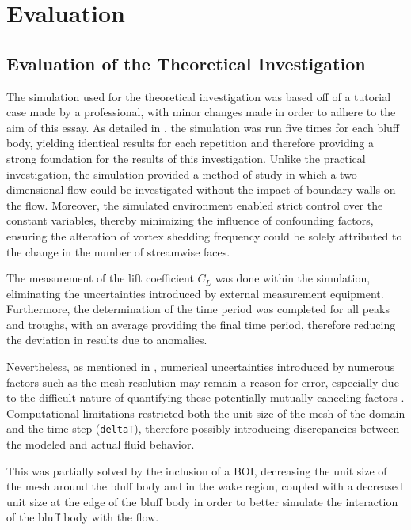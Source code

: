 \section{Evaluation}

\subsection{Evaluation of the Theoretical Investigation}
The simulation used for the theoretical investigation was based off of a tutorial case made by a professional, with minor changes made in order to adhere to the aim of this essay. As detailed in , the simulation was run five times for each bluff body, yielding identical results for each repetition and therefore providing a strong foundation for the results of this investigation. Unlike the practical investigation, the simulation provided a method of study in which a two-dimensional flow could be investigated without the impact of boundary walls on the flow. Moreover, the simulated environment enabled strict control over the constant variables, thereby minimizing the influence of confounding factors, ensuring the alteration of vortex shedding frequency could be solely attributed to the change in the number of streamwise faces. 

The measurement of the lift coefficient $C_L$ was done within the simulation, eliminating the uncertainties introduced by external measurement equipment. Furthermore, the determination of the time period was completed for all peaks and troughs, with an average providing the final time period, therefore reducing the deviation in results due to anomalies.

Nevertheless, as mentioned in , numerical uncertainties introduced by numerous factors such as the mesh resolution may remain a reason for error, especially due to the difficult nature of quantifying these potentially mutually canceling factors \parencite{city7565}. Computational limitations restricted both the unit size of the mesh of the domain and the time step (\verb*|deltaT|), therefore possibly introducing discrepancies between the modeled and actual fluid behavior.

This was partially solved by the inclusion of a BOI, decreasing the unit size of the mesh around the bluff body and in the wake region, coupled with a decreased unit size at the edge of the bluff body in order to better simulate the interaction of the bluff body with the flow. 


